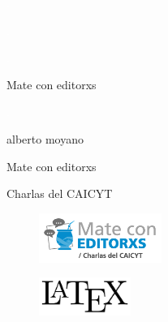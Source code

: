 \newpage
\thispagestyle{empty}
{\textcolor{white}{.}}

\newpage
\thispagestyle{empty}
{\textcolor{white}{.}}

\newpage
\thispagestyle{empty}
{\textcolor{white}{.}}

\vspace{30mm}

\begin{center}
	\LARGE{Mate con editorxs}
\end{center}

\newpage
\thispagestyle{empty}
{\textcolor{white}{.}}

\newpage
\thispagestyle{empty}
\begin{center}%
{\sc\large{alberto moyano}}\\ %
\end{center}

\vspace{30mm}

\begin{center}
\LARGE{Mate con editorxs}\\\vspace{10mm}

\Large{Charlas del CAICYT}
\end{center}

\vfill

\begin{figure}[b]
\centering
\includegraphics[width=40mm]{./media/mate.png}
\end{figure}

\newpage
\thispagestyle{empty}
\begin{figure}[t]
\centering
\vspace{-10mm}
\includegraphics[width=30mm]{./media/logo-LaTeX.png}\\
\end{figure}

